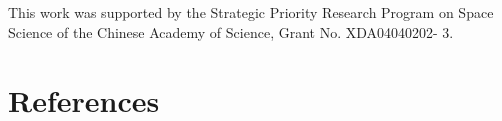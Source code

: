 \documentclass[5p, times]{elsarticle}
\begin{document}
This work was supported by the Strategic Priority Research Program on Space Science of the Chinese Academy of Science, Grant No. XDA04040202- 3. 
\appendix
\section{}
\label{app:}

\section*{References}

\end{document}
